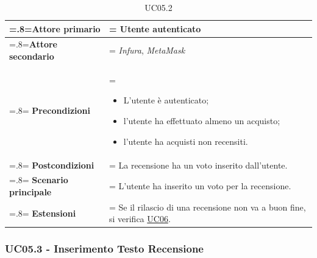                 \begin{table}[H]
                    \centering
                    \renewcommand{\arraystretch}{1.8}
                    \renewcommand\tabularxcolumn[1]{m{#1}}
                    \begin{tabularx}{0.9\textwidth}{
                        >{\hsize=.8\hsize\linewidth=\hsize}X
                        >{\hsize=1.2\hsize\linewidth=\hsize}X}
                        \hline
                        \textbf{Attore primario} & Utente autenticato \\
                        \hline
                        \textbf{Attore secondario} & \textit{Infura}, \textit{MetaMask} \\
                        \hline
                        \textbf{Precondizioni} &
                            \begin{itemize}
                                \item L'utente è autenticato;
                                \item l'utente ha effettuato almeno un acquisto;
                                \item l'utente ha acquisti non recensiti.
                            \end{itemize} \\
                        \hline
                        \textbf{Postcondizioni} & La recensione ha un voto inserito dall'utente. \\
                        \hline
                        \textbf{Scenario principale} &
                        L'utente ha inserito un voto per la recensione. \\
                        \hline
                        \textbf{Estensioni} & Se il rilascio di una recensione non va a buon fine, si verifica \hyperref[UC06]{UC06}. \\
                        \hline
                    \end{tabularx}
                    \caption{UC05.2}
                \end{table}

            \subsubsection{UC05.3 - Inserimento Testo Recensione}
            \label{UC05.3}

